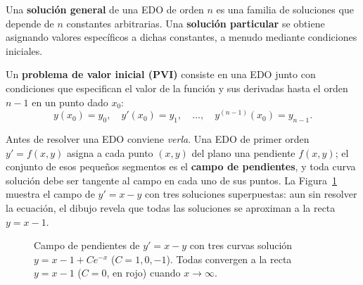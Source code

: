 \begin{definition}
Una \textbf{solución general} de una EDO de orden \(n\) es una familia de soluciones que depende de \(n\) constantes arbitrarias. Una \textbf{solución particular} se obtiene asignando valores específicos a dichas constantes, a menudo mediante condiciones iniciales.
\end{definition}

\begin{definition}
Un \textbf{problema de valor inicial (PVI)} consiste en una EDO junto con condiciones que especifican el valor de la función y sus derivadas hasta el orden \(n-1\) en un punto dado \(x_0\):
\[
y(x_0)=y_0,\quad y'(x_0)=y_1,\quad \dots,\quad y^{(n-1)}(x_0)=y_{n-1}.
\]
\end{definition}

Antes de resolver una EDO conviene \emph{verla}. Una EDO de primer orden \(y'=f(x,y)\) asigna a cada punto \((x,y)\) del plano una pendiente \(f(x,y)\); el conjunto de esos pequeños segmentos es el \textbf{campo de pendientes}, y toda curva solución debe ser tangente al campo en cada uno de sus puntos. La Figura~\ref{fig:campo_pendientes} muestra el campo de \(y'=x-y\) con tres soluciones superpuestas: aun sin resolver la ecuación, el dibujo revela que todas las soluciones se aproximan a la recta \(y=x-1\).

\begin{figure}[!htbp]
\centering
{}
\caption{Campo de pendientes de \(y'=x-y\) con tres curvas solución \(y=x-1+Ce^{-x}\) (\(C=1,0,-1\)). Todas convergen a la recta \(y=x-1\) (\(C=0\), en rojo) cuando \(x\to\infty\).}
\label{fig:campo_pendientes}
\end{figure}

